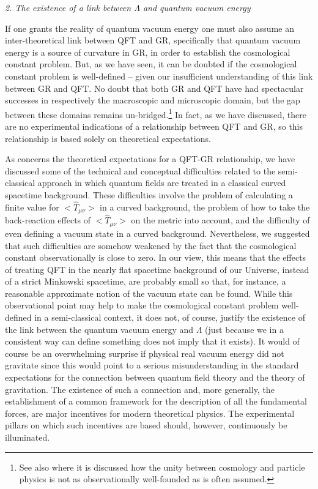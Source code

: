 \documentclass[12pt]{article}
\begin{document}
\noindent
{\em 2. The existence of a link between $\Lambda$ and quantum vacuum energy}

\noindent
If one grants the reality of quantum vacuum energy one must also
assume an inter-theoretical link between QFT and GR, specifically
that quantum vacuum energy is a source of curvature in GR, in order
to establish the cosmological constant problem.  But, as we have seen,
it can be doubted if the cosmological constant problem is well-defined
-- given our insufficient understanding of this link between GR and
QFT. No doubt that both GR and QFT have had spectacular successes in
respectively the macroscopic and microscopic domain, but the gap
between these domains remains un-bridged.\footnote{See also
\cite{zinkernagel99} where it is discussed how the unity between
cosmology and particle physics is not as observationally well-founded
as is often assumed.}  In fact, as we have discussed, there are no
experimental indications of a relationship between QFT and GR, so this
relationship is based solely on theoretical expectations.

As concerns the theoretical expectations for a QFT-GR
relationship, we have discussed some of the technical and
conceptual difficulties related to the semi-classical approach in
which quantum fields are treated in a classical curved spacetime
background. These difficulties involve the problem of calculating
a finite value for $<\hat{T}_{\mu\nu}>$ in a curved background,
the problem of how to take the back-reaction effects of
$<\hat{T}_{\mu\nu}>$ on the metric into account, and the
difficulty of even defining a vacuum state in a curved background.
Nevertheless, we suggested that such difficulties are somehow
weakened by the fact that the cosmological constant
observationally is close to zero. In our view, this means that the
effects of treating QFT in the nearly flat spacetime background of
our Universe, instead of a strict Minkowski spacetime, are
probably small so that, for instance, a reasonable approximate
notion of the vacuum state can be found. While this observational
point may help to make the cosmological constant problem
well-defined in a semi-classical context, it does not, of course,
justify the existence of the link between the quantum vacuum
energy and $\Lambda$ (just because we in a consistent way can
define something does not imply that it exists). 
It would of course be an overwhelming surprise if physical
real vacuum energy did not gravitate since this would point to 
a serious misunderstanding in the standard expectations for
the connection between quantum field theory and the theory
of gravitation. The existence of such a connection and, more
generally, the establishment of a common framework for the 
description of all the fundamental forces, are major incentives
for modern theoretical physics. The experimental pillars on which
such incentives are based should, however, continuously be
illuminated.
\end{document}

